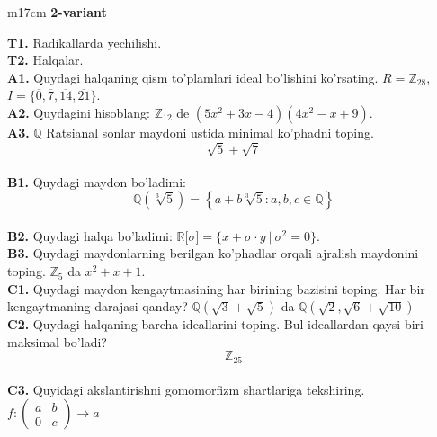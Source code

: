 \documentclass{article}
\begin{document}
\begin{tabular}{m{17cm}}
\textbf{2-variant}
\newline

\textbf{T1.} Radikallarda yechilishi. \\
\textbf{T2.} Halqalar. \\
\textbf{A1.} Quydagi halqaning qism to'plamlari ideal bo'lishini ko'rsating.
\(R = \mathbb{Z}_{28}\), \(I = \{\overline{0},\overline{7},\overline{14},\overline{21}\}\). \\
\textbf{A2.} Quydagini hisoblang:
\(\mathbb{Z}_{12}\) de \(\left( 5x^{2} + 3x - 4 \right)\left( 4x^{2} - x + 9 \right)\). \\
\textbf{A3.} \(\mathbb{Q}\) Ratsianal sonlar maydoni ustida minimal ko'phadni toping.
\[\sqrt{5} + \sqrt{7}\] \\
\textbf{B1.} Quydagi maydon bo'ladimi:
\[\mathbb{Q}\left( \sqrt[3]{5} \right) = \left\{ a + b\sqrt[3]{5}:a,b,c \in \mathbb{Q} \right\}\] \\
\textbf{B2.} Quydagi halqa bo'ladimi:
\(\mathbb{R\lbrack}\sigma\rbrack = \{ x + \sigma \cdot y\ |\ \sigma^{2} = 0\}\). \\
\textbf{B3.} Quydagi maydonlarning berilgan ko'phadlar orqali ajralish maydonini toping.
\(\mathbb{Z}_{5}\) da \(x^{2} + x + 1\). \\
\textbf{C1.} Quydagi maydon kengaytmasining har birining bazisini toping. Har bir kengaytmaning darajasi qanday?
\(\mathbb{Q}\left( \sqrt{3} + \sqrt{5} \right)\) da \(\mathbb{Q}\left( \sqrt{2},\sqrt{6} + \sqrt{10} \right)\) \\
\textbf{C2.} Quydagi halqaning barcha ideallarini toping. Bul ideallardan qaysi-biri maksimal bo'ladi?
\[\mathbb{Z}_{25}\] \\
\textbf{C3.} Quyidagi akslantirishni gomomorfizm shartlariga tekshiring. \(f:\begin{pmatrix}
a & b \\
0 & c
\end{pmatrix} \rightarrow a\) \\

\end{tabular}
\vspace{1cm}
\end{document}
